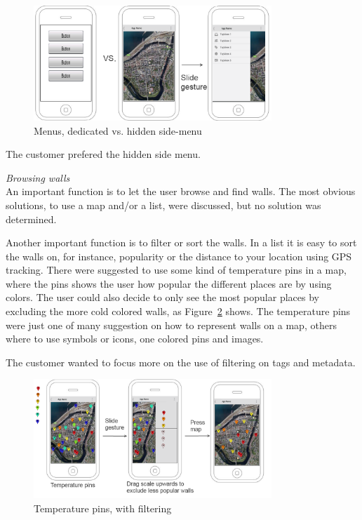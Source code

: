 \documentclass[11pt]{book}
\begin{document}
\begin{figure}[H]
      \centering
      \includegraphics[width=0.8\textwidth]{Figures/Phases/Sprint1/versiononeSliding.png}
      \caption{Menus, dedicated vs. hidden side-menu}
      \label{fig:phases_sprint1_uiVersionOneMenu}
\end{figure}

The customer prefered the hidden side menu.

\textit{Browsing walls}\\
An important function is to let the user browse and find walls. The most obvious solutions, to use a map and/or a list, were discussed, but no solution was determined. 

Another important function is to filter or sort the walls. In a list it is easy to sort the walls on, for instance, popularity or the distance to your location using GPS tracking. There were suggested to use some kind of temperature pins in a map, where the pins shows the user how popular the different places are by using colors. The user could also decide to only see the most popular places by excluding the more cold colored walls, as Figure~\ref{fig:phases_sprint1_uiVersionOneTempPings} shows. The temperature pins were just one of many suggestion on how to represent walls on a map, others where to use symbols or icons, one colored pins and images.

The customer wanted to focus more on the use of filtering on tags and metadata.

\begin{figure}[H]
      \centering
      \includegraphics[width=0.8\textwidth]{Figures/Phases/Sprint1/versiononeTempPings.png}
      \caption{Temperature pins, with filtering}
      \label{fig:phases_sprint1_uiVersionOneTempPings}
\end{figure}
\end{document}
